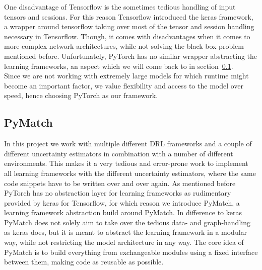 \documentclass[11pt,a4paper]{article}
\begin{document}
	One disadvantage of Tensorflow is the sometimes tedious handling of input tensors and sessions.
	For this reason Tensorflow introduced the keras framework, a wrapper around tensorflow taking over most of the tensor and session handling necessary in Tensorflow.
	Though, it comes with disadvantages when it comes to more complex network architectures, while not solving the black box problem mentioned before.
	Unfortunately, PyTorch has no similar wrapper abstracting the learning frameworks, an aspect which we will come back to in section~\ref{subsec:pymatch}.\\

	Since we are not working with extremely large models for which runtime might become an important factor, we value flexibility and access to the model over speed, hence choosing PyTorch as our framework.\\

	\subsection{PyMatch}\label{subsec:pymatch}
	In this project we work with multiple different DRL frameworks and a couple of different uncertainty estimators in combination with a number of different environments.
	This makes it a very tedious and error-prone work to implement all learning frameworks with the different uncertainty estimators, where the same code snippets have to be written over and over again.
	As mentioned before PyTorch has no abstraction layer for learning frameworks as rudimentary provided by keras for Tensorflow, for which reason we introduce PyMatch, a learning framework abstraction build around PyMatch.
	In difference to keras PyMatch does not solely aim to take over the tedious data- and graph-handling as keras does, but it is meant to abstract the learning framework in a modular way, while not restricting the model architecture in any way.
	The core idea of PyMatch is to build everything from exchangeable modules using a fixed interface between them, making code as reusable as possible.\\
\end{document}

